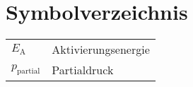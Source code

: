 %
%


\chapter*{Symbolverzeichnis}
\def\listacronymname{Symbolverzeichnis}

\begin{tabularx}{\linewidth}{ll}
$E_\text{A}$        &  Aktivierungsenergie \\
$p_\text{partial}$  &  Partialdruck \\
\end{tabularx}


\cleardoublepage
{} %
